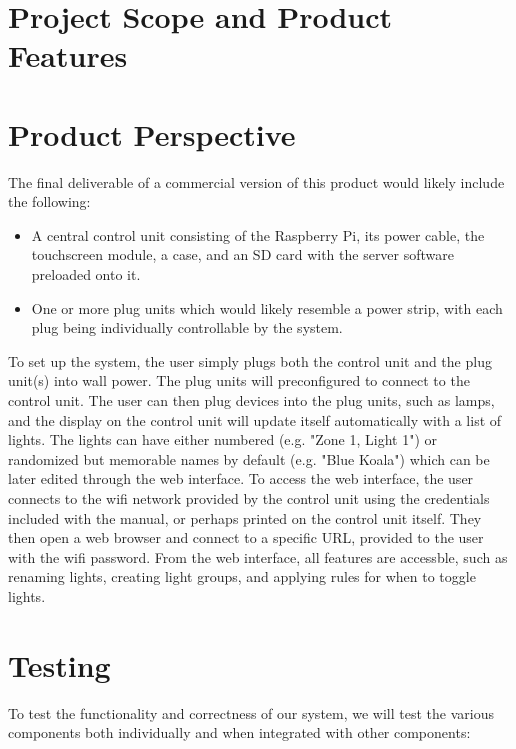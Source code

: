\documentclass[oneside,openright]{book}
\begin{document}
\section{Project Scope and Product Features}

\section{Product Perspective}

The final deliverable of a commercial version of this product would likely include the following:

\begin{itemize}
    \item A central control unit consisting of the Raspberry Pi, its power
cable, the touchscreen module, a case, and an SD card with the server software
preloaded onto it.
    \item One or more plug units which would likely resemble a power strip,
with each plug being individually controllable by the system.
\end{itemize}

To set up the system, the user simply plugs both the control unit and the plug
unit(s) into wall power.  The plug units will preconfigured to connect to the
control unit.  The user can then plug devices into the plug units, such as
lamps, and the display on the control unit will update itself automatically
with a list of lights.  The lights can have either numbered (e.g. "Zone 1,
Light 1") or randomized but memorable names by default (e.g. "Blue Koala")
which can be later edited through the web interface.  To access the web
interface, the user connects to the wifi network provided by the control unit
using the credentials included with the manual, or perhaps printed on the
control unit itself.  They then open a web browser and connect to a specific
URL, provided to the user with the wifi password.  From the web interface, all
features are accessble, such as renaming lights, creating light groups, and
applying rules for when to toggle lights.

\section{Testing}

To test the functionality and correctness of our system, we will test the various components both individually and when integrated with other components:
\end{document}
